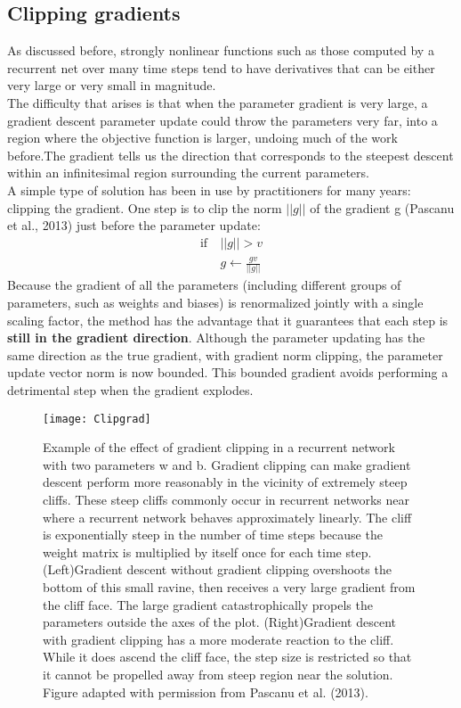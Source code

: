 \subsection{Clipping gradients}
As discussed before, strongly nonlinear functions such as those computed by a recurrent net over many time steps tend to have derivatives that can be either very large or very small in magnitude. \\
The difficulty that arises is that when the parameter gradient is very large, a gradient descent parameter update could throw the parameters very far, into a region where the objective function is larger, undoing much of the work before.The gradient tells us the direction that corresponds to the steepest descent within an infinitesimal region surrounding the current parameters. \\
A simple type of solution has been in use by practitioners for many years:
clipping the gradient. One step is to clip the norm $||g||$ of the gradient g (Pascanu et al., 2013) just before the parameter update:
\begin{eqnarray}
\text{if} \ & ||g||  > v \\
& g\leftarrow \frac{g v}{||g||}
\end{eqnarray}
Because the gradient of all the parameters (including different groups of parameters, such as weights and biases) is renormalized jointly with a single scaling factor, the method has the advantage that it guarantees that each step is \textbf{still in the gradient direction}. Although the parameter updating has the same direction as the true gradient, with gradient norm clipping, the parameter update vector norm is now bounded. This bounded gradient avoids performing a detrimental step when the gradient explodes.
\begin{figure}[H]
	\centering
	\texttt{[image: Clipgrad]}
	\caption{Example of the effect of gradient clipping in a recurrent network with two parameters w and b. Gradient clipping can make gradient descent perform more reasonably in the vicinity of extremely steep cliffs. These steep cliffs commonly occur in recurrent networks near where a recurrent network behaves approximately linearly. The cliff is exponentially steep in the number of time steps because the weight matrix is multiplied by itself once for each time step. (Left)Gradient descent without gradient clipping overshoots the bottom of this small ravine, then receives a very large gradient from the cliff face. The large gradient catastrophically propels the parameters outside the axes of the plot. (Right)Gradient descent with gradient clipping has a more moderate reaction to the cliff. While it does ascend the cliff face, the step size is restricted so that it cannot be propelled away from steep region near the solution. Figure adapted with permission from Pascanu et al. (2013).
}
\end{figure}
